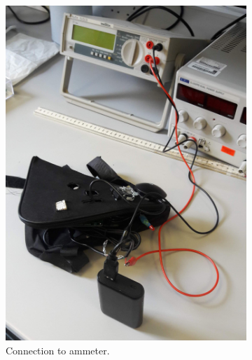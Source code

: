 \documentclass[11pt,twosided,a4paper]{report}
\begin{document}


\begin{figure}
\centering
\begin{subfigure}[b]{0.4\textwidth}
  \includegraphics[width=\textwidth]{images/ammeter}
  \caption{Connection to ammeter.}
  \label{fig: ammeter}
\end{subfigure}
\hfill
\begin{subfigure}[b]{0.4\textwidth}

\end{subfigure}
\end{figure}
\end{document}
